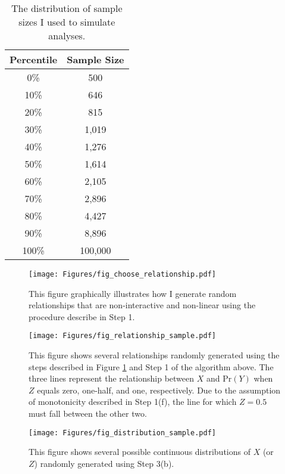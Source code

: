 \documentclass[12pt]{article}
\begin{document}
\begin{appendix}
\begin{table}[h]
\begin{center}
\begin{tabular}{|cc|}
\hline
Percentile & Sample Size \\ 
\hline
0\% & 500 \\ 
10\% & 646 \\ 
20\% & 815 \\ 
30\% & 1,019 \\ 
40\% & 1,276 \\ 
50\% & 1,614 \\ 
60\% & 2,105 \\ 
70\% & 2,896 \\ 
80\% & 4,427 \\ 
90\% & 8,896 \\ 
100\% & 100,000 \\ 
\hline
\end{tabular}\caption{The distribution of sample sizes I used to simulate analyses.}\label{tab:n}
\end{center}
\end{table}     

        \begin{figure}[h]
        \begin{center}
        \texttt{[image: Figures/fig\_choose\_relationship.pdf]}
        \end{center}\caption{This figure graphically illustrates how I generate random relationships that are non-interactive and non-linear using the procedure describe in Step 1.}\label{fig:choose_relationship}
        \end{figure}
        
 
              \begin{figure}[h]
        \begin{center}
        \texttt{[image: Figures/fig\_relationship\_sample.pdf]}
        \end{center}\caption{This figure shows several relationships randomly generated using the steps described in Figure \ref{fig:choose_relationship} and Step 1 of the algorithm above. The three lines represent the relationship between $X$ and $\text{Pr}(Y)$ when $Z$ equals zero, one-half, and one, respectively. Due to the assumption of monotonicity described in Step 1(f), the line for which $Z = 0.5$ must fall between the other two.}\label{fig:relationship_sample}
        \end{figure}
        
                                \begin{figure}[h]
        \begin{center}
        \texttt{[image: Figures/fig\_distribution\_sample.pdf]}
        \end{center}\caption{This figure shows several possible continuous distributions of $X$ (or $Z$) randomly generated using Step 3(b). }\label{fig:distribution_sample}
        \end{figure}
        
        
   


\end{appendix}
\end{document}
